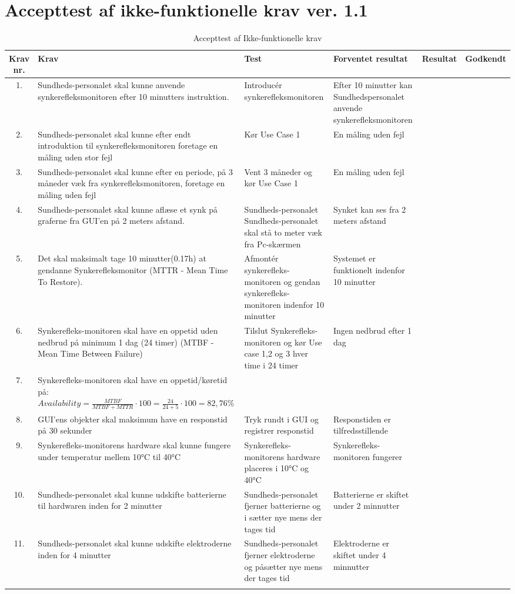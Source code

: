 \newpage
\section{Accepttest af ikke-funktionelle krav ver. 1.1}

\begin{longtabu} to 
	Krav nr. & Krav & Test & Forventet resultat & Resultat & Godkendt
	\\[-1ex] \midrule
	
	1. & Sundheds-personalet skal kunne anvende synkerefleksmonitoren efter 10 minutters instruktion. & Introducér synkerefleksmonitoren & Efter 10 minutter kan Sundhedspersonalet anvende synkerefleksmonitoren &  & 	\\
2. & Sundheds-personalet skal kunne efter endt introduktion til synkerefleksmonitoren foretage en måling uden stor fejl & Kør Use Case 1 & En måling uden fejl & & 	\\ 
3. & Sundheds-personalet skal kunne efter en periode, på 3 måneder væk fra synkerefleksmonitoren, foretage en måling uden fejl & Vent 3 måneder og kør Use Case 1 & En måling uden fejl & & 	\\ 
4. & Sundheds-personalet skal kunne aflæse et synk på graferne fra GUI'en på 2 meters afstand. & Sundheds-personalet Sundheds-personalet skal stå to meter væk fra Pc-skærmen & Synket kan ses fra 2 meters afstand&  & 	\\ 

5.& Det skal maksimalt tage 10 minutter(0.17h) at gendanne Synkerefleksmonitor (MTTR - Mean Time To Restore). & Afmontér synkerefleks-monitoren og gendan synkerefleks-monitoren indenfor  10 minutter  & Systemet er funktionelt indenfor 10 minutter & & 	\\ 
6. & Synkerefleks-monitoren skal have en oppetid uden nedbrud på minimum 1 dag (24 timer)
(MTBF - Mean Time Between Failure)& Tilslut Synkerefleks-monitoren og kør Use case 1,2 og 3 hver time i 24 timer  & Ingen nedbrud efter 1 dag &  & 	\\ 
7. & Synkerefleks-monitoren skal have en oppetid/køretid på: $Availability = \frac{MTBF}{MTBF+MTTR}\cdot100 = \frac{24}{24+5}\cdot100 = 82,76 \%$& &  &  & 	\\ 

8. &GUI'ens objekter skal maksimum have en responstid på 30 sekunder & Tryk rundt i GUI og registrer responstid & Responstiden er tilfredsstillende &  & 	\\
9. & Synkerefleks-monitorens hardware skal kunne fungere under temperatur mellem \ang{10}C til \ang{40}C & Synkerefleks-monitorens hardware placeres i \ang{10}C og \ang{40}C  & Synkerefleks-monitoren fungerer&  & 	\\ 
10. & Sundheds-personalet skal kunne udskifte batterierne til hardwaren inden for 2 minutter &  Sundheds-personalet fjerner batterierne og i sætter nye mens der tages tid & Batterierne er skiftet under 2 minnutter &  & 	\\ 
11. & Sundheds-personalet skal kunne udskifte elektroderne inden for 4 minutter &  Sundheds-personalet fjerner elektroderne og påsætter nye mens der tages tid & Elektroderne er skiftet under 4 minnutter &  & 	\\ 

	\bottomrule
\caption{Accepttest af Ikke-funktionelle krav}
\end{longtabu}





